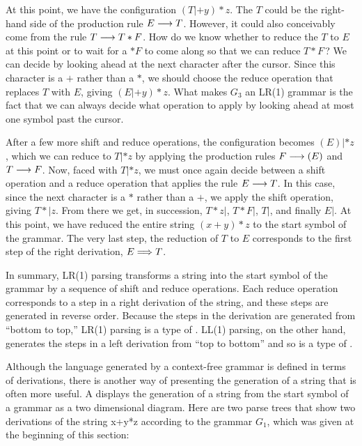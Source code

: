 At this point, we have the configuration $(T|+y)*z$.  The $T$
could be the right-hand side of the production rule $E\longrightarrow T$.
However, it could also conceivably come from the rule $T\longrightarrow T*F$.
How do we know whether to reduce the $T$ to $E$ at this point or to
wait for a $*F$ to come along so that we can reduce $T*F\,$?
We can decide by looking ahead at the next character after the
cursor.  Since this character is a $+$ rather than a $*$,
we should choose the reduce operation that replaces $T$ with $E$,
giving $(E|+y)*z$.  What makes $G_3$ an LR(1) grammar is the fact
that we can always decide what operation to apply by looking
ahead at most one symbol past the cursor.

After a few more shift and reduce operations, the configuration
becomes $(E)|*z$, which we can reduce to $T|*z$ by applying the
production rules $F\longrightarrow (E)$ and $T\longrightarrow F$.
Now, faced with $T|*z$, we must once again decide between
a shift operation and a reduce operation that applies the
rule $E\longrightarrow T$.  In this case, since the next character is
a $*$ rather than a $+$, we apply the shift operation, giving
$T*|z$.  From there we get, in succession, $T*z|$,
$T*F|$, $T|$, and finally $E|$.  At this point, we have reduced
the entire string $(x+y)*z$ to the start symbol of the grammar.
The very last step, the reduction of $T$ to $E$ corresponds to
the first step of the right derivation, $E\Longrightarrow T$.

In summary, LR(1) parsing transforms a string into the
start symbol of the grammar by a sequence of shift and
reduce operations.  Each reduce operation corresponds to a
step in a right derivation of the string, and these steps
are generated in reverse order.  Because the steps in the
derivation are generated from ``bottom to top,'' LR(1)
parsing is a type of .  LL(1) parsing,
on the other hand, generates the steps in a left derivation
from ``top to bottom'' and so is a type of .

\medbreak

Although the language generated by a context-free grammar
is defined in terms of derivations, there is another way of
presenting the generation of a string that is often more useful.
A  displays the generation of a string from
the start symbol of a grammar as a two dimensional diagram.
Here are two parse trees that show two derivations of the
string x+y*z according to the grammar $G_1$, which was given
at the beginning of this section:
\bigskip
\centerline{}

